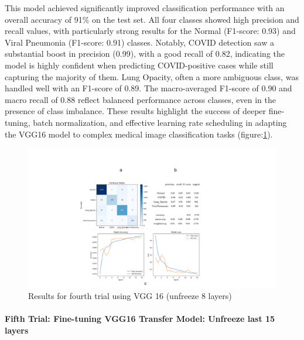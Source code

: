\documentclass{article}
\begin{document}
This model achieved significantly improved classification performance with an overall accuracy of 91\% on the test set. All four classes showed high precision and recall values, with particularly strong results for the Normal (F1-score: 0.93) and Viral Pneumonia (F1-score: 0.91) classes. Notably, COVID detection saw a substantial boost in precision (0.99), with a good recall of 0.82, indicating the model is highly confident when predicting COVID-positive cases while still capturing the majority of them. Lung Opacity, often a more ambiguous class, was handled well with an F1-score of 0.89. The macro-averaged F1-score of 0.90 and macro recall of 0.88 reflect balanced performance across classes, even in the presence of class imbalance. These results highlight the success of deeper fine-tuning, batch normalization, and effective learning rate scheduling in adapting the VGG16 model to complex medical image classification tasks (figure:\ref{fig:vgg16result4.png}).

\begin{figure}[h!] %
    \centering
    \includegraphics[width=1.0\linewidth]{vgg16-8.png}
    \caption{Results for fourth trial using VGG 16 (unfreeze 8 layers)}
    \label{fig:vgg16result4.png}
\end{figure}


\paragraph{Fifth Trial: Fine-tuning VGG16 Transfer Model: Unfreeze last 15 layers}\mbox{}\\
\end{document}
